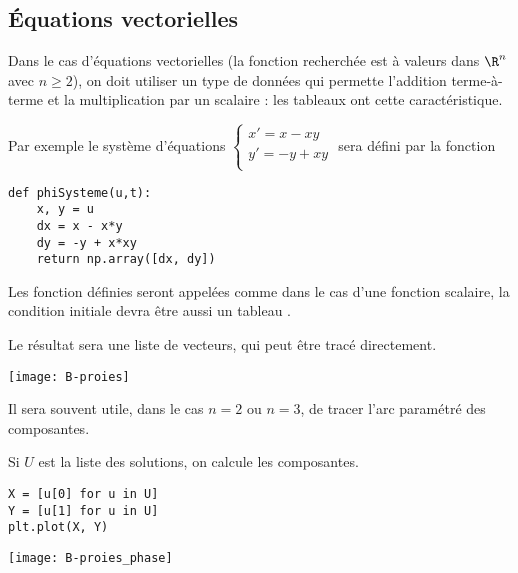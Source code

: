 \subsection{Équations vectorielles}
Dans le cas d'équations vectorielles (la fonction recherchée est à valeurs dans $\R^n$ avec $n\ge 2$), on doit utiliser  un type de données qui permette l'addition terme-à-terme et la multiplication par un scalaire : les tableaux  ont cette caractéristique.

\medskip

Par exemple le système d'équations $\left\{\begin{matrix} x' = x - xy\\ y' = -y +xy\\ \end{matrix}\right.$ sera défini par la fonction

\medskip
\begin{lstlisting}
def phiSysteme(u,t):
    x, y = u
    dx = x - x*y
    dy = -y + x*xy
    return np.array([dx, dy])
\end{lstlisting}

Les fonction définies seront appelées comme dans le cas d'une fonction scalaire, la condition initiale devra être aussi un tableau .

Le résultat sera une liste de vecteurs, qui peut être tracé directement.
\begin{center}
\texttt{[image: B-proies]}
\end{center}
Il sera souvent utile, dans le cas $n = 2$ ou $n =3$, de tracer l'arc paramétré des composantes.

Si $U$ est la liste des solutions, on calcule les composantes.
\begin{lstlisting}
X = [u[0] for u in U]
Y = [u[1] for u in U]
plt.plot(X, Y)
\end{lstlisting}
\begin{center}
\texttt{[image: B-proies\_phase]}
\end{center}

